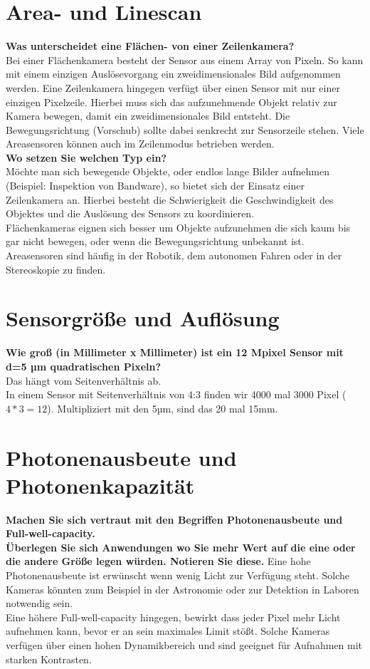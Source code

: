 \documentclass[a4paper]{article}
\begin{document}
	\section{Area- und Linescan}
	\textbf{Was unterscheidet eine Flächen- von einer Zeilenkamera?}\\
	Bei einer Flächenkamera besteht der Sensor aus einem Array von Pixeln. So kann mit einem einzigen Auslösevorgang ein zweidimensionales Bild aufgenommen werden. Eine Zeilenkamera hingegen verfügt über einen Sensor mit nur einer einzigen Pixelzeile. Hierbei muss sich das aufzunehmende Objekt relativ zur Kamera bewegen, damit ein zweidimensionales Bild entsteht. Die Bewegungsrichtung (Vorschub) sollte dabei senkrecht zur Sensorzeile stehen. Viele Areasensoren können auch im Zeilenmodus betrieben werden.\\
	\textbf{Wo setzen Sie welchen Typ ein?}\\
	Möchte man sich bewegende Objekte, oder endlos lange Bilder aufnehmen (Beispiel: Inspektion von Bandware), so bietet sich der Einsatz einer Zeilenkamera an. Hierbei besteht die Schwierigkeit die Geschwindigkeit des Objektes und die Auslösung des Sensors zu koordinieren.\\
	Flächenkameras eignen sich besser um Objekte aufzunehmen die sich kaum bis gar nicht bewegen, oder wenn die Bewegungsrichtung unbekannt ist. Areasensoren sind häufig in der Robotik, dem autonomen Fahren oder in der Stereoskopie zu finden.
	
	\section{Sensorgröße und Auflösung}
	\textbf{Wie groß (in Millimeter x Millimeter) ist ein 12 Mpixel Sensor mit d=5 µm quadratischen
	Pixeln?}\\
	Das hängt vom Seitenverhältnis ab.\\In einem Sensor mit Seitenverhältnis von 4:3 finden wir 4000 mal 3000 Pixel ($4*3=12$). Multipliziert mit den 5µm, sind das 20 mal 15mm.
	
	\section{Photonenausbeute und Photonenkapazität}
	\textbf{Machen Sie sich vertraut mit den Begriffen Photonenausbeute und Full-well-capacity.}\\
	\textbf{Überlegen Sie sich Anwendungen wo Sie mehr Wert auf die eine oder die andere Größe
	legen würden. Notieren Sie diese.}
	Eine hohe Photonenausbeute ist erwünscht wenn wenig Licht zur Verfügung steht. Solche Kameras könnten zum Beispiel in der Astronomie oder zur Detektion in Laboren notwendig sein.\\
	Eine höhere Full-well-capacity hingegen, bewirkt dass jeder Pixel mehr Licht aufnehmen kann, bevor er an sein maximales Limit stößt. Solche Kameras verfügen über einen hohen Dynamikbereich und sind geeignet für Aufnahmen mit starken Kontrasten.
	
\end{document}
